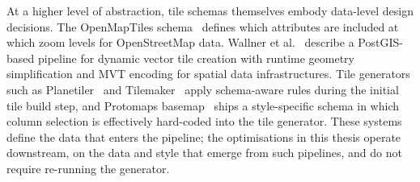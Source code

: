 At a higher level of abstraction, tile schemas themselves embody data-level design decisions.
The OpenMapTiles schema~\cite{VectorTilesAre2025} defines which attributes are included at which zoom levels for OpenStreetMap data.
Wallner et al.~\cite{wallnerOpenSourceVector2022} describe a PostGIS-based pipeline for dynamic vector tile creation with runtime geometry simplification and MVT encoding for spatial data infrastructures.
Tile generators such as Planetiler~\cite{OnthegomapPlanetiler2026} and Tilemaker~\cite{TilemakerDIYVector} apply schema-aware rules during the initial tile build step, and Protomaps basemap~\cite{brandonProtomaps} ships a style-specific schema in which column selection is effectively hard-coded into the tile generator.
These systems define the data that enters the pipeline; the optimisations in this thesis operate downstream, on the data and style that emerge from such pipelines, and do not require re-running the generator.

